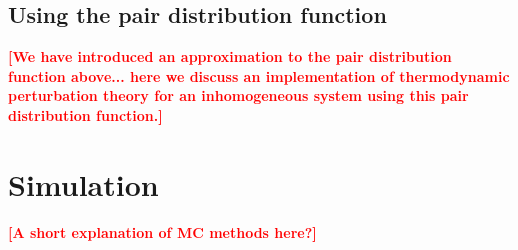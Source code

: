 \documentclass[letterpaper,twocolumn,amsmath,amssymb,pre,aps,10pt]{revtex4-1}
\newcommand\rr{\mathbf{r}}
\newcommand\fixme[1]{\textcolor{red}{\textbf{[#1]}}}
\begin{document}



\subsection{Using the pair distribution function}


\fixme{We have introduced an approximation to the pair distribution
  function above... here we discuss an implementation of thermodynamic
  perturbation theory for an inhomogeneous system using this pair
  distribution function.}


\section{Simulation}

\fixme{A short explanation of MC methods here?}

\end{document}
